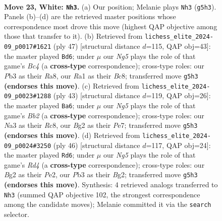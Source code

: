 \documentclass[11pt]{article}
\begin{document}
\clearpage

\begin{figure}[p]\centering
\begin{subfigure}{0.46\textwidth}\centering
\resizebox{\linewidth}{!}{%
\newchessgame
\chessboard[
  setfen={2b2q2/1p3pkp/r4np1/p5N1/Pn6/NPB3P1/5PBP/R3R1K1 w - - 1 23},
  showmover=false,
  pgfstyle=straightmove, color=movearrow, markmove={g5-h3}
]}
\caption{}
\end{subfigure}\hfill
\begin{subfigure}{0.46\textwidth}\centering
\resizebox{\linewidth}{!}{%
\newchessgame
\chessboard[
  setfen={r1bq1rk1/1p4p1/p1p5/2bNQ1P1/P4P2/1P5p/1KP1N3/3R3R b - - 0 24},
  showmover=false,
  pgfstyle=straightmove, color=movearrow, markmove={c5-d6}
]}
\caption{}
\end{subfigure}
\\[4pt]
\begin{subfigure}{0.46\textwidth}\centering
\resizebox{\linewidth}{!}{%
\newchessgame
\chessboard[
  setfen={2r2rk1/1b2pp1p/1q1p2p1/8/P7/2bQ1NP1/R3PPBP/3R2K1 b - - 0 22},
  showmover=false,
  pgfstyle=straightmove, color=movearrow, markmove={b7-a6}
]}
\caption{}
\end{subfigure}\hfill
\begin{subfigure}{0.46\textwidth}\centering
\resizebox{\linewidth}{!}{%
\newchessgame
\chessboard[
  setfen={r1b4r/pp1p2k1/1n3np1/4BpN1/3R3P/2P3P1/P3PPB1/5RK1 w - - 9 24},
  showmover=false,
  pgfstyle=straightmove, color=movearrow, markmove={d4-d6}
]}
\caption{}
\end{subfigure}
\caption{\textbf{Move 23, White: \texttt{Nh3}.} (a) Our position; Melanie plays \texttt{Nh3} (\texttt{g5h3}). Panels (b)--(d) are the retrieved master positions whose correspondence most drove this move (highest QAP objective among those that transfer to it). (b) Retrieved from \texttt{lichess\_elite\_2024-09\_p0017\#1621} (ply 47) [structural distance $d$=115, QAP obj=43]: the master played \texttt{Bd6}; under $\mu$ our \emph{Ng5} plays the role of that game's \emph{Bc4} (a \textbf{cross-type} correspondence); cross-type roles: our \emph{P}b3 as their \emph{R}a8, our \emph{R}a1 as their \emph{B}c8; transferred move \texttt{g5h3} \textbf{(endorses this move)}. (c) Retrieved from \texttt{lichess\_elite\_2024-09\_p0023\#1288} (ply 43) [structural distance $d$=119, QAP obj=26]: the master played \texttt{Ba6}; under $\mu$ our \emph{Ng5} plays the role of that game's \emph{Bb2} (a \textbf{cross-type} correspondence); cross-type roles: our \emph{N}a3 as their \emph{R}c8, our \emph{B}g2 as their \emph{P}e7; transferred move \texttt{g5h3} \textbf{(endorses this move)}. (d) Retrieved from \texttt{lichess\_elite\_2024-09\_p0024\#3250} (ply 46) [structural distance $d$=117, QAP obj=24]: the master played \texttt{Rd6}; under $\mu$ our \emph{Ng5} plays the role of that game's \emph{Rd4} (a \textbf{cross-type} correspondence); cross-type roles: our \emph{B}g2 as their \emph{P}e2, our \emph{P}b3 as their \emph{B}g2; transferred move \texttt{g5h3} \textbf{(endorses this move)}. Synthesis: 4 retrieved analogs transferred to \texttt{Nh3} (summed QAP objective 102, the strongest correspondence among the candidate moves); Melanie committed it via the \texttt{search} selector.}

\end{figure}
\end{document}
